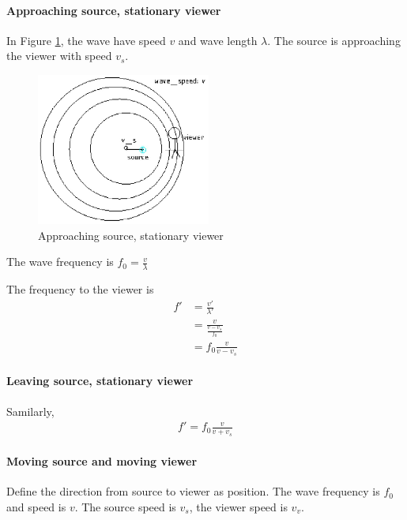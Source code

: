         \paragraph{Approaching source, stationary viewer}
            In Figure \ref{de_assv}, the wave have speed $v$ and wave length $\lambda$. The source is approaching the viewer with speed $v_s$.
            \begin{figure}[H]
                \begin{center}
                    \includegraphics[height=5cm]{wave_charts/dopeff_app_sou_sta_vie.eps}
                \end{center}
                \caption{Approaching source, stationary viewer}
                \label{de_assv}
            \end{figure}

            The wave frequency is $f_0 = \frac{v}{\lambda}$

            The frequency to the viewer is
            \begin{align}
                f' &= \frac{v'}{\lambda'} \\
                   &= \frac{v}{\frac{v - v_s}{f_0}} \\
                   &= f_0 \frac{v}{v - v_s}
            \end{align}

        \paragraph{Leaving source, stationary viewer}
            Samilarly, 
            \begin{align}
                f' = f_0 \frac{v}{v + v_s}
            \end{align}

        \paragraph{Moving source and moving viewer}
            Define the direction from source to viewer as position. The wave frequency is $f_0$ and speed is $v$. The source speed is $v_s$, the viewer speed is $v_v$.

